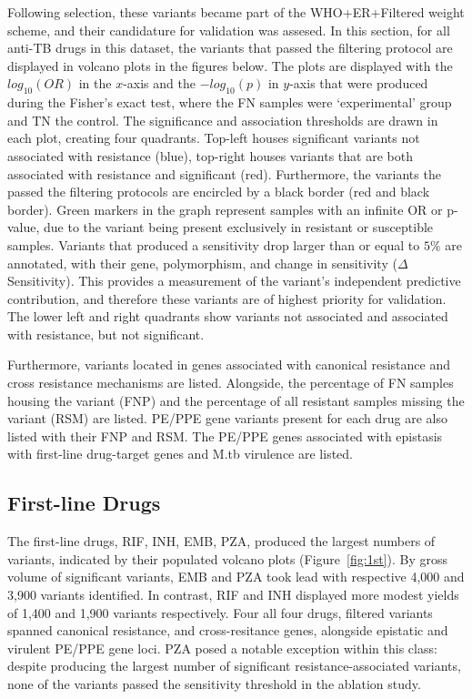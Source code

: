 Following selection, these variants became part of the WHO+ER+Filtered weight scheme, and their candidature for validation was assesed. In this section, for all anti-TB drugs in this dataset, the variants that passed the filtering protocol are displayed in volcano plots in the figures below. The plots are displayed with the $log_{10}(OR)$ in the $x$-axis and the $-log_{10}(p)$ in $y$-axis that were produced during the Fisher's exact test, where the FN samples were `experimental' group and TN the control. The significance and association thresholds are drawn in each plot, creating four quadrants. Top-left houses significant variants not associated with resistance (blue), top-right houses variants that are both associated with resistance and significant (red). Furthermore, the variants the passed the filtering protocols are encircled by a black border (red and black border). Green markers in the graph represent samples with an infinite OR or p-value, due to the variant being present exclusively in resistant or susceptible samples. Variants that produced a sensitivity drop larger than or equal to $5\%$ are annotated, with their gene, polymorphism, and change in sensitivity ($\Delta$Sensitivity). This provides a measurement of the variant's independent predictive contribution, and therefore these variants are of highest priority for validation. The lower left and right quadrants show variants not associated and associated with resistance, but not significant.

Furthermore, variants located in genes associated with canonical resistance and cross resistance mechanisms are listed. Alongside, the percentage of FN samples housing the variant (FNP) and the percentage of all resistant samples missing the variant (RSM) are listed. PE/PPE gene variants present for each drug are also listed with their FNP and RSM. The PE/PPE genes associated with epistasis with first-line drug-target genes and M.tb virulence are listed. 

\subsection*{First-line Drugs}
The first-line drugs, RIF, INH, EMB, PZA, produced the largest numbers of variants, indicated by their populated volcano plots (Figure~\ref{fig:1st}). By gross volume of significant variants, EMB and PZA took lead with respective 4,000 and 3,900 variants identified. In contrast, RIF and INH displayed more modest yields of 1,400 and 1,900 variants respectively. Four all four drugs, filtered variants spanned canonical resistance, and cross-resitance genes, alongside epistatic and virulent PE/PPE gene loci. PZA posed a notable exception within this class: despite producing the largest number of significant resistance-associated variants, none of the variants passed the sensitivity threshold in the ablation study. 

